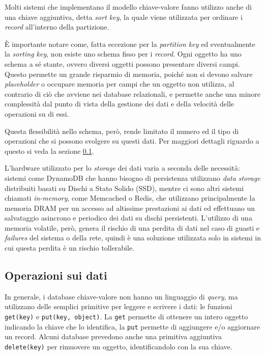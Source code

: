 Molti sistemi che implementano il modello chiave-valore fanno utilizzo anche di una chiave aggiuntiva, detta \textit{sort key}, la quale viene utilizzata per ordinare i \textit{record} all'interno della partizione.

È importante notare come, fatta eccezione per la \textit{partition key} ed eventualmente la \textit{sorting key}, non esiste uno schema fisso per i \textit{record}. Ogni oggetto ha uno schema a sé stante, ovvero diversi oggetti possono presentare diversi campi. Questo permette un grande risparmio di memoria, poiché non si devono salvare \textit{placeholder} o occupare memoria per campi che un oggetto non utilizza, al contrario di ciò che avviene nei database relazionali, e permette anche una minore complessità dal punto di vista della gestione dei dati e della velocità delle operazioni su di essi.

Questa flessibilità nello schema, però, rende limitato il numero ed il tipo di operazioni che si possono svolgere su questi dati. Per maggiori dettagli riguardo a questo si veda la sezione \ref{ops}.

L'hardware utilizzato per lo \textit{storage} dei dati varia a seconda delle necessità: sistemi come DynamoDB che hanno bisogno di persistenza utilizzano \textit{data storage} distribuiti basati su Dischi a Stato Solido (SSD), mentre ci sono altri sistemi chiamati \textit{in-memory}, come Memcached o Redis, che utilizzano principalmente la memoria DRAM per un accesso ad altissime prestazioni ai dati ed effettuano un salvataggio asincrono e periodico dei dati su dischi persistenti. L'utilizzo di una memoria volatile, però, genera il rischio di una perdita di dati nel caso di guasti e \textit{failures} del sistema o della rete, quindi è una soluzione utilizzata solo in sistemi in cui questa perdita è un rischio tollerabile. 

\subsection{Operazioni sui dati}\label{ops}

In generale, i database chiave-valore non hanno un linguaggio di \textit{query}, ma utilizzano delle semplici primitive per leggere e scrivere i dati: le funzioni \verb|get(key)| e \verb|put(key, object)|. La \verb|get| permette di ottenere un intero oggetto indicando la chiave che lo identifica, la \verb|put| permette di aggiungere e/o aggiornare un record. Alcuni database prevedono anche una primitiva aggiuntiva \verb|delete(key)| per rimuovere un oggetto, identificandolo con la sua chiave.

